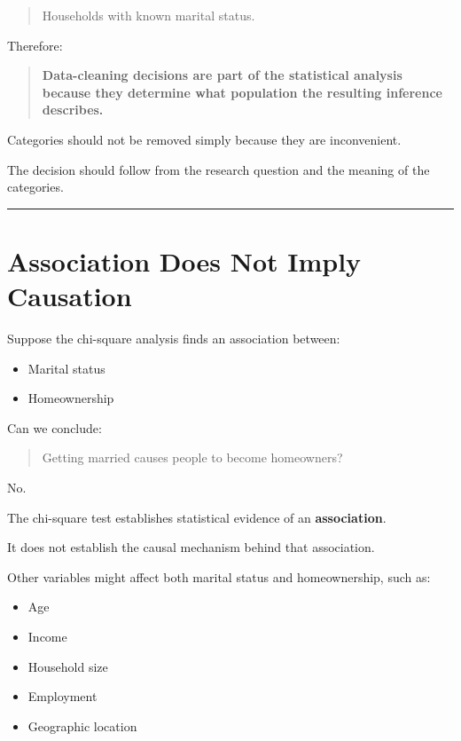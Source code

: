 \documentclass[
  letterpaper,
  DIV=11,
  numbers=noendperiod]{scrreprt}
\providecommand{\tightlist}{%
  \setlength{\itemsep}{0pt}\setlength{\parskip}{0pt}}
\begin{document}
\begin{quote}
Households with known marital status.
\end{quote}

Therefore:

\begin{quote}
\textbf{Data-cleaning decisions are part of the statistical analysis
because they determine what population the resulting inference
describes.}
\end{quote}

Categories should not be removed simply because they are inconvenient.

The decision should follow from the research question and the meaning of
the categories.

\begin{center}\rule{0.5\linewidth}{0.5pt}\end{center}


\chapter{Association Does Not Imply
Causation}\label{association-does-not-imply-causation}

Suppose the chi-square analysis finds an association between:

\begin{itemize}
\tightlist
\item
  Marital status
\item
  Homeownership
\end{itemize}

Can we conclude:

\begin{quote}
Getting married causes people to become homeowners?
\end{quote}

No.

The chi-square test establishes statistical evidence of an
\textbf{association}.

It does not establish the causal mechanism behind that association.

Other variables might affect both marital status and homeownership, such
as:

\begin{itemize}
\tightlist
\item
  Age
\item
  Income
\item
  Household size
\item
  Employment
\item
  Geographic location
\end{itemize}
\end{document}
